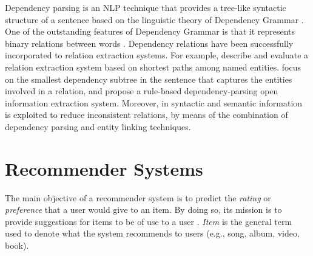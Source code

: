 Dependency parsing is an NLP technique that provides a tree-like syntactic structure of a sentence based on the linguistic theory of Dependency Grammar \citep{Tesniere1959}. One of the outstanding features of Dependency Grammar is that it represents binary relations between words \citep{BallesterosNivre2013}.%
Dependency relations have been successfully incorporated to relation extraction systems. For example, \cite{BunescuandMooney2005} describe and evaluate a relation extraction system based on shortest paths among named entities. \cite{CulottaSorensen2004} focus on the smallest dependency subtree in the sentence that captures the entities involved in a relation, and \cite{Gamallo2012} propose a rule-based dependency-parsing open information extraction system. Moreover, in \cite{Nakasholeetal2012,MoroandNavigli2012,DelliBovietal2015b} syntactic and semantic information is exploited to reduce inconsistent relations, by means of the combination of dependency parsing and entity linking techniques.


\section{Recommender Systems}
\label{sec:SOA:recommendation}

The main objective of a recommender system is to predict the \textit{rating} or \textit{preference} that a user would give to an item. By doing so, its mission is to provide suggestions for items to be of use to a user \citep{ricci2011introduction}. \textit{Item} is the general term used to denote what the system recommends to users (e.g., song, album, video, book).

